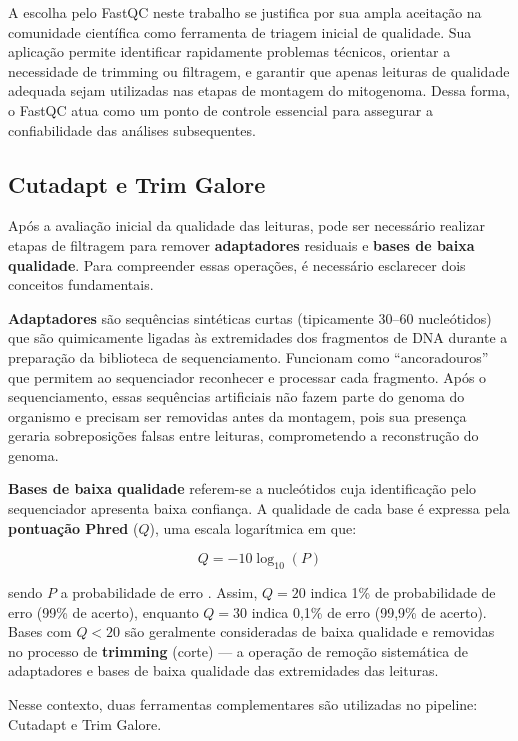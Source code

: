 A escolha pelo FastQC neste trabalho se justifica por sua ampla aceitação na comunidade científica como ferramenta de triagem inicial de qualidade. Sua aplicação permite identificar rapidamente problemas técnicos, orientar a necessidade de trimming ou filtragem, e garantir que apenas leituras de qualidade adequada sejam utilizadas nas etapas de montagem do mitogenoma. Dessa forma, o FastQC atua como um ponto de controle essencial para assegurar a confiabilidade das análises subsequentes.

\subsection{Cutadapt e Trim Galore}

Após a avaliação inicial da qualidade das leituras, pode ser necessário realizar etapas de filtragem para remover \textbf{adaptadores} residuais e \textbf{bases de baixa qualidade}. Para compreender essas operações, é necessário esclarecer dois conceitos fundamentais.

\textbf{Adaptadores} são sequências sintéticas curtas (tipicamente 30--60 nucleótidos) que são quimicamente ligadas às extremidades dos fragmentos de DNA durante a preparação da biblioteca de sequenciamento. Funcionam como ``ancoradouros'' que permitem ao sequenciador reconhecer e processar cada fragmento. Após o sequenciamento, essas sequências artificiais não fazem parte do genoma do organismo e precisam ser removidas antes da montagem, pois sua presença geraria sobreposições falsas entre leituras, comprometendo a reconstrução do genoma.

\textbf{Bases de baixa qualidade} referem-se a nucleótidos cuja identificação pelo sequenciador apresenta baixa confiança. A qualidade de cada base é expressa pela \textbf{pontuação Phred} ($Q$), uma escala logarítmica em que:

\begin{equation}
Q = -10 \log_{10}(P)
\label{eq:phred}
\end{equation}

\noindent sendo $P$ a probabilidade de erro \cite{ewing1998}. Assim, $Q = 20$ indica 1\% de probabilidade de erro (99\% de acerto), enquanto $Q = 30$ indica 0,1\% de erro (99,9\% de acerto). Bases com $Q < 20$ são geralmente consideradas de baixa qualidade e removidas no processo de \textbf{trimming} (corte) --- a operação de remoção sistemática de adaptadores e bases de baixa qualidade das extremidades das leituras.

Nesse contexto, duas ferramentas complementares são utilizadas no pipeline: Cutadapt e Trim Galore.

